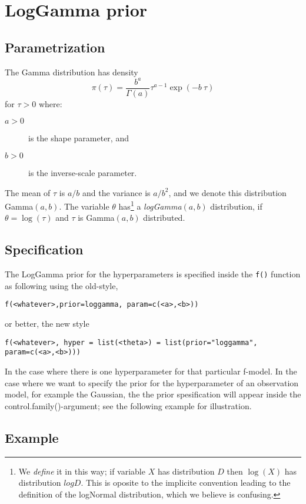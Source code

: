 \documentclass[a4paper,11pt]{article}
\begin{document}
\section*{LogGamma prior}

\subsection*{Parametrization}
The Gamma  distribution has density
\begin{equation}
    \pi(\tau)=\frac{b^a}{\Gamma(a)}\tau^{a-1}\exp(-b\ \tau)
\end{equation}
for $\tau>0$ where:
\begin{description}
\item[$a>0$] is the shape parameter, and
\item[$b>0$] is the inverse-scale parameter.
\end{description}
The mean of $\tau$ is $a/b$ and the variance is $a/b^2$, and we denote
this distribution  Gamma$(a,b)$.  The variable $\theta$
has\footnote{We \emph{define} it in this way; if variable $X$ has
    distribution $D$ then $\log(X)$ has distribution $logD$. This is
    oposite to the implicite convention leading to the definition of
    the logNormal distribution, which we believe is confusing.}  a
\emph{logGamma}$(a,b)$ distribution, if $\theta=\log(\tau)$ and $\tau$
is Gamma$(a,b)$ distributed.

\subsection*{Specification}
The LogGamma prior for the hyperparameters is specified inside the
{\tt f()} function as following using the old-style,
\begin{center}
    {\tt f(<whatever>,prior=loggamma, param=c(<a>,<b>))}
\end{center}
or better, the new style
\begin{center}
    {\tt f(<whatever>, hyper = list(<theta>) =
        list(prior="loggamma", param=c(<a>,<b>)))}
\end{center}
In the case where there is one hyperparameter for that particular
f-model. In the case where we want to specify the prior for the
hyperparameter of an observation model, for example the
Gaussian, the the prior spesification will appear inside the
control.family()-argument; see the following example for illustration.

\subsection*{Example}
\end{document}

